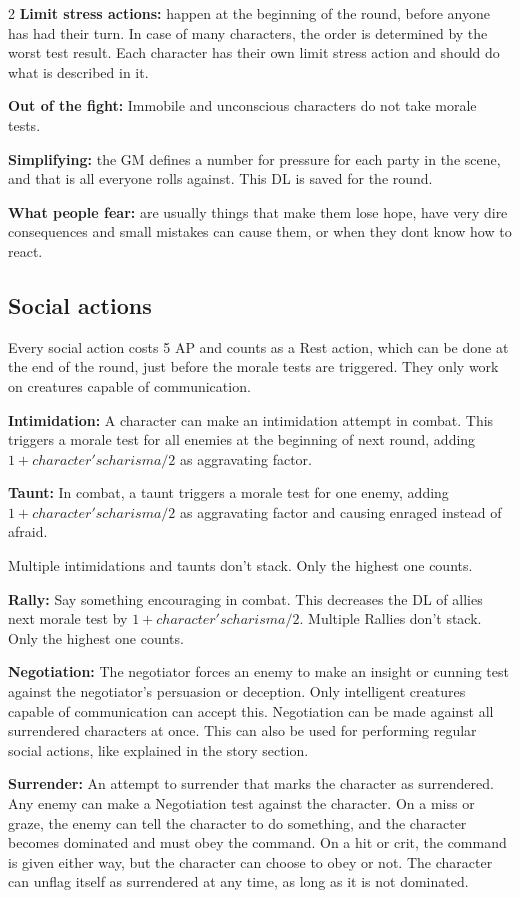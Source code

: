 \begin{multicols}{2}
\textbf{Limit stress actions:} happen at the beginning of the round, before anyone has had their turn. In case of many characters, the order is determined by the worst test result. Each character has their own limit stress action and should do what is described in it.

\textbf{Out of the fight:} Immobile and unconscious characters do not take morale tests.

\textbf{Simplifying:} the GM defines a number for pressure for each party in the scene, and that is all everyone rolls against. This DL is saved for the round.

\textbf{What people fear:} are usually things that make them lose hope, have very dire consequences and small mistakes can cause them, or when they dont know how to react.

\subsection{Social actions}

Every social action costs 5 AP and counts as a Rest action, which can be done at the end of the round, just before the morale tests are triggered. They only work on creatures capable of communication.

\textbf{Intimidation:} A character can make an intimidation attempt in combat. This triggers a morale test for all enemies at the beginning of next round, adding $1 + character's charisma/2$ as aggravating factor.

\textbf{Taunt:} In combat, a taunt triggers a morale test for one enemy, adding $1 + character's charisma/2$ as aggravating factor and causing enraged instead of afraid.

Multiple intimidations and taunts don't stack. Only the highest one counts.

\textbf{Rally:} Say something encouraging in combat. This decreases the DL of allies next morale test by $1 + character's charisma/2$. Multiple Rallies don't stack. Only the highest one counts.

\textbf{Negotiation:} The negotiator forces an enemy to make an insight or cunning test against the negotiator's persuasion or deception. Only intelligent creatures capable of communication can accept this. Negotiation can be made against all surrendered characters at once. This can also be used for performing regular social actions, like explained in the story section.

\textbf{Surrender:} An attempt to surrender that marks the character as surrendered. Any enemy can make a Negotiation test against the character. On a miss or graze, the enemy can tell the character to do something, and the character becomes dominated and must obey the command. On a hit or crit, the command is given either way, but the character can choose to obey or not. The character can unflag itself as surrendered at any time, as long as it is not dominated.


\end{multicols}
